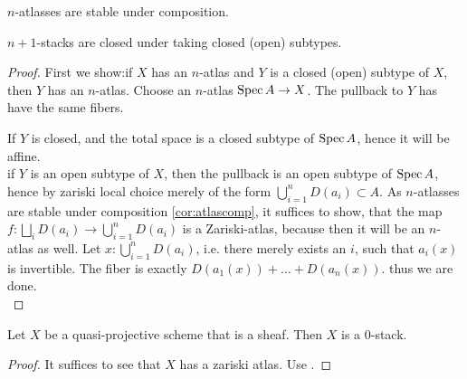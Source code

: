 \documentclass{article}
\begin{document}
\begin{corollary}{\label{cor:atlascomp}}
    $n$-atlasses are stable under composition.
\end{corollary}
\begin{lemma}
 $n+1$-stacks are closed under taking closed (open) subtypes.
\end{lemma}
\begin{proof}
First we show:if $X$ has an $n$-atlas and $Y$ is a closed (open) subtype of $X$, then $Y$ has an $n$-atlas. %
    Choose an $n$-atlas $\operatorname{Spec} A \to X$. The pullback to $Y$ has have the same fibers.
    
    If $Y$ is closed,  and the total space is a closed subtype of $\operatorname{Spec} A$, hence it will be affine. \\
    if $Y$ is an open subtype of $X$, then the pullback is an open subtype of $\operatorname{Spec} A$, hence by zariski local choice merely of the form $\bigcup_{i=1}^n D(a_i) \subset A$. 
    As $n$-atlasses are stable under composition \ref{cor:atlascomp}, it suffices to show, that the map $f : \bigsqcup_i D(a_i) \to \bigcup_{i=1}^n D(a_i)$ is a Zariski-atlas, because then it will be an $n$-atlas as well. Let $x : \bigcup_{i=1}^n D(a_i)$, i.e. there merely exists an $i$, such that $a_i(x)$ is invertible. The fiber is exactly $D(a_1(x)) + \hdots + D(a_n(x))$. thus we are done. \\
    \end{proof}
\begin{corollary}
    Let $X$ be a quasi-projective scheme that is a sheaf. Then $X$ is a  0-stack. 
\end{corollary}   
\begin{proof}
    It suffices to see that $X$ has a zariski atlas. Use \label{ex:PnIsStack}.
\end{proof}
\end{document}
